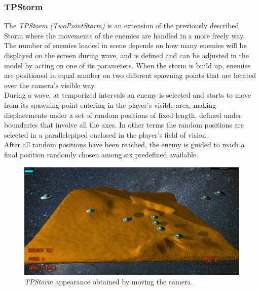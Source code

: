 \subsubsection{TPStorm}
The \textit{TPStorm (TwoPointStorm)} is an extension of the previously described Storm where the movements of the enemies are handled in a more freely way. \\
The number of enemies loaded in scene depends on how many enemies will be displayed on the screen during wave, and is defined and can be adjusted in the model by acting on one of its parameters. When the storm is build up, enemies are positioned in equal number on two different spawning points that are located over the camera's visible way. \\
During a wave, at temporized intervals an enemy is selected and starts to move from its spawning point entering in the player's visible area, making displacements under a set of random positions of fixed length, defined under boundaries that involve all the axes. In other terms the random positions are selected in a parallelepiped enclosed in the player's field of vision. \\
After all random positions have been reached, the enemy is guided to reach a final position randomly chosen among six predefined available.
\begin{figure}[h!]
\begin{center}
\includegraphics[scale=0.22]{images/tps-orbitview.png}
\caption{\textit{TPStorm} appearance obtained by moving the camera.}
\end{center}
\end{figure}
